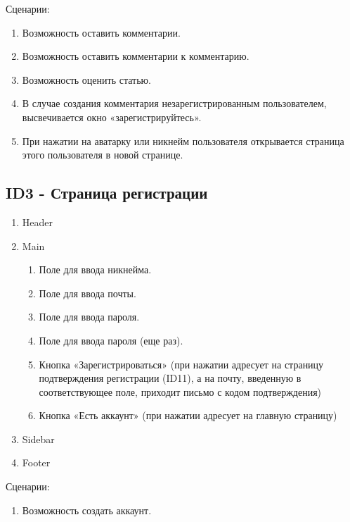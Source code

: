 \documentclass[a4paper]{article}
\begin{document}
			\large{Сценарии:}
				\begin{enumerate}
					\item Возможность оставить комментарии.
					\item Возможность оставить комментарии к комментарию.
					\item Возможность оценить статью.
					\item В случае создания комментария незарегистрированным пользователем, высвечивается окно «зарегистрируйтесь».
					\item При нажатии на аватарку или никнейм пользователя открывается страница этого пользователя в новой странице.
				\end{enumerate}
		\newpage
		\subsection{ID3 - Страница регистрации}
			\begin{enumerate}
				\item Header
				\item Main
				\begin{enumerate}
					\item Поле для ввода никнейма.
					\item Поле для ввода почты.
					\item Поле для ввода пароля.
					\item Поле для ввода пароля (еще раз).
					\item Кнопка «Зарегистрироваться» (при нажатии адресует на страницу подтверждения регистрации (ID11), а на почту, введенную в соответствующее поле, приходит письмо с кодом подтверждения)
					\item Кнопка «Есть аккаунт» (при нажатии адресует на главную страницу)
				\end{enumerate}
				\item Sidebar
				\item Footer
			\end{enumerate}
			\large{Сценарии:}
				\begin{enumerate}
					\item Возможность создать аккаунт.
				\end{enumerate}
		\newpage
\end{document}
